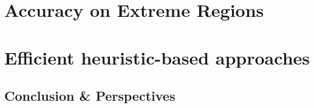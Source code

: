 \documentclass[draft]{ecsthesis}      %
\begin{document}
\part{Accuracy on Extreme Regions}\label{part:vect}




\part{Efficient heuristic-based approaches}
\label{part:heuristic}




\chapter{Conclusion \& Perspectives}\label{chap:concl}


\appendix
%
%
\backmatter




\end{document}
